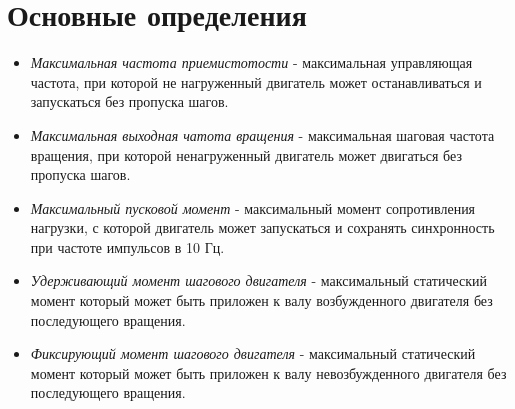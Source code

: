 \newpage
\section{ Основные определения }

\begin{itemize}
    \item \textit{Максимальная частота приемистотости} - максимальная управляющая частота,
    при которой не нагруженный двигатель может останавливаться и запускаться без пропуска шагов.

    \item \textit{Максимальная выходная чатота вращения} - максимальная шаговая частота вращения,
    при которой ненагруженный двигатель может двигаться без пропуска шагов.

    \item \textit{Максимальный пусковой момент} - максимальный момент сопротивления нагрузки,
    с которой двигатель может запускаться и сохранять синхронность при частоте импульсов в 10 Гц.

    \item \textit{Удерживающий момент шагового двигателя} - максимальный статический момент
    который может быть приложен к валу возбужденного двигателя без последующего вращения.

    \item \textit{Фиксирующий момент шагового двигателя} - максимальный статический момент
    который может быть приложен к валу невозбужденного двигателя без последующего вращения.
\end{itemize}
